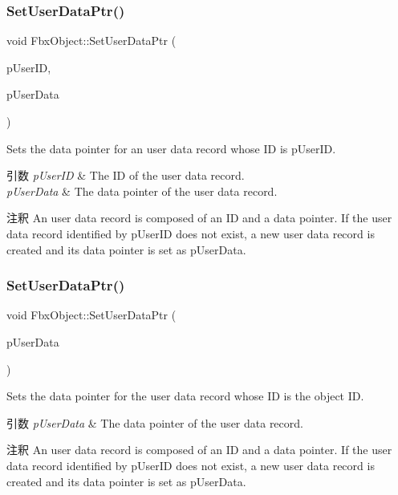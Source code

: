 \subsubsection{\texorpdfstring{Set\+User\+Data\+Ptr()}{SetUserDataPtr()}\hspace{0.1cm}{\footnotesize\ttfamily [1/2]}}
{\footnotesize\ttfamily void Fbx\+Object\+::\+Set\+User\+Data\+Ptr (\begin{DoxyParamCaption}\item[{const \hyperlink{fbxtypes_8h_a9beeca85cdc9941e912fe9eac7709b53}{Fbx\+U\+Int64} \&}]{p\+User\+ID,  }\item[{void $\ast$}]{p\+User\+Data }\end{DoxyParamCaption})}

Sets the data pointer for an user data record whose ID is p\+User\+ID. 
\begin{DoxyParams}{引数}
{\em p\+User\+ID} & The ID of the user data record. \\
\hline
{\em p\+User\+Data} & The data pointer of the user data record. \\
\hline
\end{DoxyParams}
\begin{DoxyRemark}{注釈}
An user data record is composed of an ID and a data pointer. If the user data record identified by p\+User\+ID does not exist, a new user data record is created and its data pointer is set as p\+User\+Data. 
\end{DoxyRemark}
\mbox{\label{class_fbx_object_af52325b1b5f2f1f5884d5d14d80c1922}} 
\subsubsection{\texorpdfstring{Set\+User\+Data\+Ptr()}{SetUserDataPtr()}\hspace{0.1cm}{\footnotesize\ttfamily [2/2]}}
{\footnotesize\ttfamily void Fbx\+Object\+::\+Set\+User\+Data\+Ptr (\begin{DoxyParamCaption}\item[{void $\ast$}]{p\+User\+Data }\end{DoxyParamCaption})\hspace{0.3cm}{\ttfamily [inline]}}

Sets the data pointer for the user data record whose ID is the object ID. 
\begin{DoxyParams}{引数}
{\em p\+User\+Data} & The data pointer of the user data record. \\
\hline
\end{DoxyParams}
\begin{DoxyRemark}{注釈}
An user data record is composed of an ID and a data pointer. If the user data record identified by p\+User\+ID does not exist, a new user data record is created and its data pointer is set as p\+User\+Data. 
\end{DoxyRemark}


